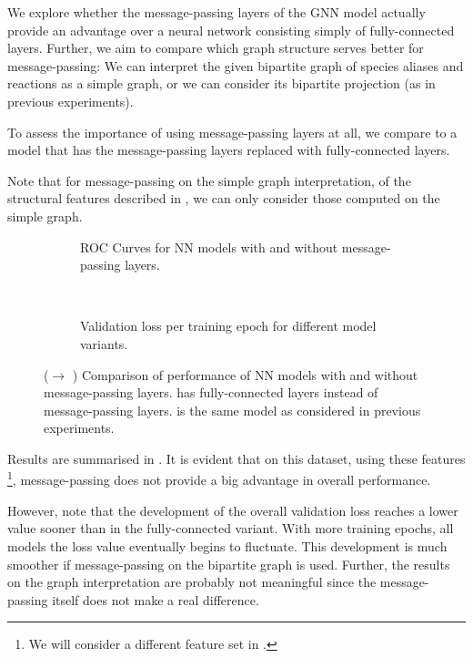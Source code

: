 \documentclass[
	fontsize=10pt, %
	twoside=false, %
	secnumdepth=1, %
  toc=indentunnumbered %
]{kaobook}
\begin{document}
We explore whether the message-passing layers of the GNN model actually provide
an advantage over a neural network
consisting simply of fully-connected layers. Further, we aim to compare which
graph structure serves better for message-passing: We can interpret the given
bipartite graph of species aliases and reactions as a simple graph, or we can
consider its bipartite projection (as in previous experiments).

To assess the importance of using message-passing layers at all, we compare to a
model that has the message-passing layers replaced with fully-connected layers.

Note that for message-passing on the simple graph interpretation, of the
structural features described in , we can only
consider those computed on the simple graph.

\begin{figure}[h]
  \centering
  \begin{subfigure}[h]{0.48\linewidth}
    \caption{ROC Curves for NN models with and without message-passing layers.}
  \end{subfigure}
  ~~
  \begin{subfigure}[h]{0.48\linewidth}
    \caption{Validation loss per training epoch for different model variants.}
  \end{subfigure}
  \caption{(\ADLast $\rightarrow$ \PDMap) Comparison of performance of NN models
    with and without message-passing layers.  has
    fully-connected layers instead of message-passing layers.
     is the same model as considered in previous
    experiments. }
  \label{fig:importance-message-passing}
\end{figure}

Results are summarised in . It is evident
that on this dataset, using these features
\footnote{
  We will consider a different feature set in .
},
message-passing does not provide a big advantage in overall performance.

However, note that the development of the overall validation loss reaches a
lower value sooner than in the fully-connected variant. With more training
epochs, all models the loss value eventually begins to fluctuate. This
development is much smoother if message-passing on the bipartite graph is used.
Further, the results on the graph interpretation are probably not meaningful
since the message-passing itself does not make a real difference.
\end{document}
